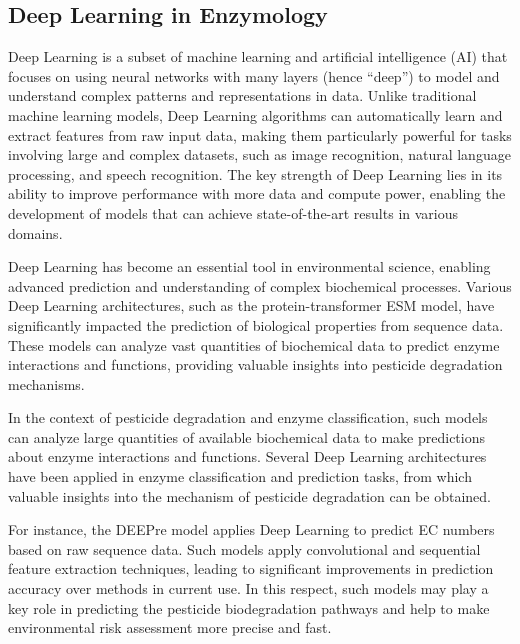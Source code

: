 \subsection{Deep Learning in Enzymology}
\label{sec:Deep Learning in Enzymology}

Deep Learning is a subset of machine learning and artificial intelligence (AI) that focuses on using neural networks with many layers (hence “deep”) to model and understand complex patterns and representations in data. Unlike traditional machine learning models, Deep Learning algorithms can automatically learn and extract features from raw input data, making them particularly powerful for tasks involving large and complex datasets, such as image recognition, natural language processing, and speech recognition. The key strength of Deep Learning lies in its ability to improve performance with more data and compute power, enabling the development of models that can achieve state-of-the-art results in various domains. \autocite{sarkerDeepLearningComprehensive2021}

Deep Learning has become an essential tool in environmental science, enabling advanced prediction and understanding of complex biochemical processes. Various Deep Learning architectures, such as the protein-transformer ESM model, have significantly impacted the prediction of biological properties from sequence data. These models can analyze vast quantities of biochemical data to predict enzyme interactions and functions, providing valuable insights into pesticide degradation mechanisms. \autocite{rivesBiologicalStructureFunction2021}

In the context of pesticide degradation and enzyme classification, such models can analyze large quantities of available biochemical data to make predictions about enzyme interactions and functions. Several Deep Learning architectures have been applied in enzyme classification and prediction tasks, from which valuable insights into the mechanism of pesticide degradation can be obtained.

For instance, the DEEPre model applies Deep Learning to predict EC numbers based on raw sequence data. Such models apply convolutional and sequential feature extraction techniques, leading to significant improvements in prediction accuracy over methods in current use. In this respect, such models may play a key role in predicting the pesticide biodegradation pathways and help to make environmental risk assessment more precise and fast. \autocite{liDEEPreSequencebasedEnzyme2017}

